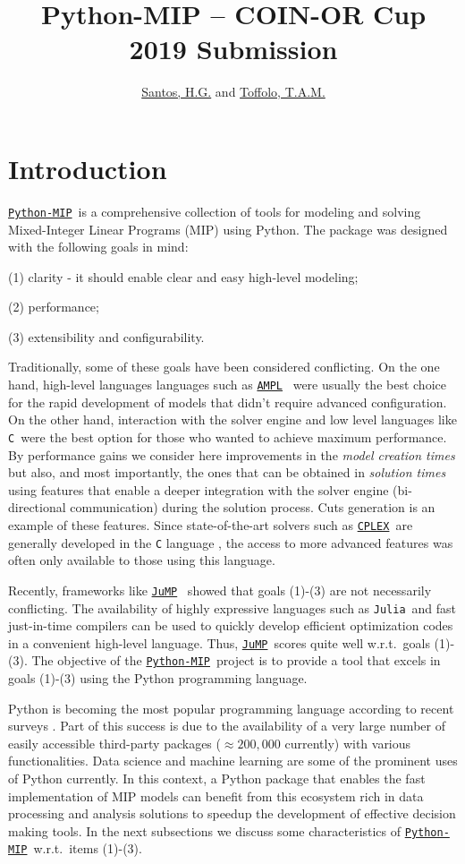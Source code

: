 \documentclass{article}
\title{Python-MIP -- COIN-OR Cup 2019 Submission }
\author{\href{http://www.decom.ufop.br/haroldo/}{Santos, H.G.} and \href{http://www.toffolo.com.br}{Toffolo, T.A.M.}}
\def\C{\texttt{C}}
\def\CPLEX{\href{https://www.ibm.com/analytics/cplex-optimizer}{\texttt{CPLEX}\textsuperscript{\textregistered}}}
\def\JuMP{\href{https://github.com/JuliaOpt/JuMP.jl}{\texttt{JuMP}}}
\def\Julia{\texttt{Julia}}
\def\PythonMIP{\href{https://github.com/coin-or/python-mip}{\texttt{Python-MIP}}}
\def\AMPL{\href{https://ampl.com}{\texttt{AMPL}}}
\begin{document}
\maketitle

\section{Introduction}

\PythonMIP\ is a comprehensive collection of tools for modeling and solving Mixed-Integer Linear Programs (MIP) using Python. 
The package was designed with the following goals in mind: 

(1) clarity - it should enable clear and easy high-level modeling; 

(2) performance;

(3) extensibility and configurability.

\noindent Traditionally, some of these goals have been considered conflicting. 
On the one hand, high-level languages languages such as \AMPL\ \cite{Fourer1987} were usually the best choice for the rapid development of models that didn't require advanced configuration.
On the other hand, interaction with the solver engine and low level languages like \C\ were the best option for those who wanted to achieve maximum performance. 
By performance gains we consider here improvements in the \emph{model creation times} but also, and most importantly, the ones that can be obtained in \emph{solution times} using features that enable a deeper integration with the solver engine (bi-directional communication) during the solution process.
Cuts generation is an example of these features.
Since state-of-the-art solvers such as \CPLEX\ are generally developed in the \texttt{C} language \cite{Bixby2002}, the access to more advanced features was often only available to those using this language.

Recently, frameworks like \JuMP\ \cite{Dunning2015} showed that goals (1)-(3) are not necessarily conflicting.
The availability of highly expressive languages such as \Julia\ and fast just-in-time compilers can be used to quickly develop efficient optimization codes in a convenient high-level language. 
Thus, \JuMP\ scores quite well w.r.t.\ goals (1)-(3). 
The objective of the \PythonMIP\ project is to provide a tool that excels in goals (1)-(3) using the Python programming language.

Python is becoming the most popular programming language according to recent surveys \cite{Econ2018}. 
Part of this success is due to the availability of a very large number of easily accessible third-party packages ($\approx 200,000$ currently) with various functionalities. 
Data science and machine learning are some of the prominent uses of Python currently. 
In this context, a Python package that enables the fast implementation of MIP models can benefit from this ecosystem rich in data processing and analysis solutions to speedup the development of effective decision making tools. 
In the next subsections we discuss some characteristics of \PythonMIP\ w.r.t.\ items (1)-(3).
\end{document}
